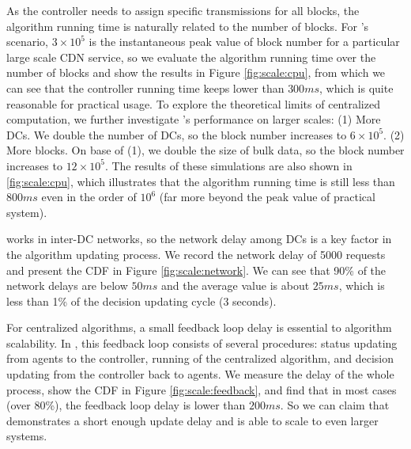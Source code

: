  As the controller needs to assign specific transmissions for all blocks, the algorithm running time is naturally related to the number of blocks. For \company's scenario, $3\times 10^5$ is the instantaneous peak value of block number for a particular large scale CDN service, so we evaluate the algorithm running time over the number of blocks and show the results in Figure \ref{fig:scale:cpu}, from which we can see that the controller running time keeps lower than $300ms$, which is quite reasonable for practical usage.
To explore the theoretical limits of centralized computation, we further investigate \name's performance on larger scales: (1) More DCs. We double the number of DCs, so the block number increases to $6\times 10^5$. (2) More blocks. On base of (1), we double the size of bulk data, so the block number increases to $12\times 10^5$. The results of these simulations are also shown in \ref{fig:scale:cpu}, which illustrates that the algorithm running time is still less than $800ms$ even in the order of $10^6$ (far more beyond the peak value of practical system).

 \name works in inter-DC networks, so the network delay among DCs is a key factor in the algorithm updating process. We record the network delay of 5000 requests and present the CDF in Figure \ref{fig:scale:network}. We can see that 90\% of the network delays are below $50ms$ and the average value is about $25ms$, which is less than 1\% of the decision updating cycle (3 seconds).

 For centralized algorithms, a small feedback loop delay is essential to algorithm scalability. In \name, this feedback loop consists of several procedures: status updating from agents to the controller, running of the centralized algorithm, and decision updating from the controller back to agents. We measure the delay of the whole process, show the CDF in Figure \ref{fig:scale:feedback}, and find that in most cases (over 80\%), the feedback loop delay is lower than $200ms$. So we can claim that \name demonstrates a short enough update delay and is able to scale to even larger systems.

